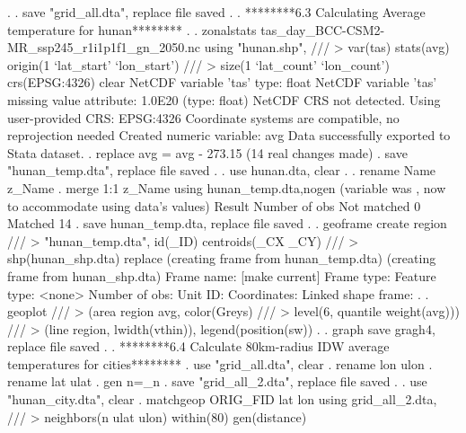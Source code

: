      {\BLC}
{\smallskip}
. 
. save "grid_all.dta", replace
file{} saved
{\smallskip}
. 
. ********6.3 Calculating Average temperature for hunan********
. 
. zonalstats tas_day_BCC-CSM2-MR_ssp245_r1i1p1f1_gn_2050.nc using "hunan.shp", ///
>                       var(tas) stats(avg) origin(1 `lat_start' `lon_start') ///
>                               size(1 `lat_count' `lon_count') crs(EPSG:4326) clear
NetCDF variable 'tas' type: float
NetCDF variable 'tas' missing value attribute: 1.0E20 (type: float)
NetCDF CRS not detected. Using user-provided CRS: EPSG:4326
Coordinate systems are compatible, no reprojection needed
Created numeric variable: avg
Data successfully exported to Stata dataset.
{\smallskip}
. replace avg = avg - 273.15
(14 real changes made)
{\smallskip}
. save "hunan_temp.dta", replace
file{} saved
{\smallskip}
. 
. use hunan.dta, clear
{\smallskip}
. 
. rename Name z_Name  
{\smallskip}
. merge 1:1 z_Name using hunan_temp.dta,nogen
(variable {} was {}, now {} to accommodate using data's values)
{\smallskip}
    Result                      Number of obs
    Not matched                             0
    Matched                                14  
{\smallskip}
. save hunan_temp.dta, replace
file{} saved
{\smallskip}
. 
. geoframe create region ///
>    "hunan_temp.dta", id(_ID) centroids(_CX _CY) ///
>     shp(hunan_shp.dta) replace
(creating frame {} from hunan_temp.dta)
(creating frame {} from hunan_shp.dta)
{\smallskip}
            Frame name: {} [make current]
            Frame type: {}
          Feature type: <none>
         Number of obs: {}
               Unit ID: {}
           Coordinates: {}
    Linked shape frame: {}
{\smallskip}
. 
. geoplot ///
>  (area region avg, color(Greys) ///
>                    level(6, quantile weight(avg))) ///
>  (line region, lwidth(vthin)), legend(position(sw))
{\smallskip}
. 
. graph save gragh4, replace
file {} saved
{\smallskip}
. 
. ********6.4 Calculate 80km-radius IDW average temperatures for cities********
. use "grid_all.dta", clear
{\smallskip}
. rename lon ulon
{\smallskip}
. rename lat ulat
{\smallskip}
. gen n=_n
{\smallskip}
. save "grid_all_2.dta", replace
file{} saved
{\smallskip}
. 
. use "hunan_city.dta", clear
{\smallskip}
. matchgeop ORIG_FID lat lon using grid_all_2.dta, ///
>                      neighbors(n ulat ulon) within(80) gen(distance)
